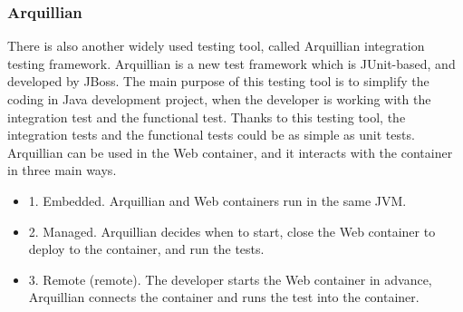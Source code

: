 \documentclass{article}
\begin{document}
\subsubsection{Arquillian}
There is also another widely used testing tool, called Arquillian integration testing framework.
Arquillian is a new test framework which is JUnit-based, and developed by JBoss. The main purpose of this testing tool is to simplify the coding in Java development project, when the developer is working with the integration test and the functional test. Thanks to this testing tool, the integration tests and the functional tests could be as simple as unit tests. Arquillian can be used in the Web container, and it interacts with the container in three main ways.
\begin{itemize}
	\item 1. Embedded. Arquillian and Web containers run in the same JVM.
	\item 2. Managed. Arquillian decides when to start, close the Web container to deploy to the container, and run the tests.
	\item 3. Remote (remote). The developer starts the Web container in advance, Arquillian connects the container and runs the test into the container.
\end{itemize}
\end{document}
